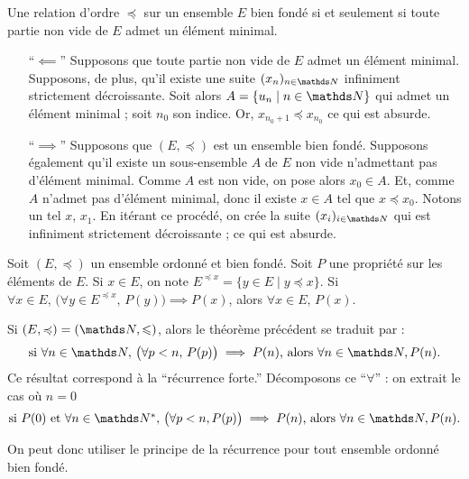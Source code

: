 \begin{prop}
	Une relation d'ordre $\preceq$\/ sur un ensemble $E$\/ bien fondé si et seulement si toute partie non vide de $E$\/ admet un élément minimal.
\end{prop}

\begin{prv}
	\begin{itemize}
		\item[``$\impliedby$'']
			Supposons que toute partie non vide de $E$\/ admet un élément minimal.
			Supposons, de plus, qu'il existe une suite $(x_n)_{n\in\N}$\/ infiniment strictement décroissante.
			Soit alors $A = \{u_n  \mid n \in \N\}$ qui admet un élément minimal ; soit $n_0$\/ son indice.
			Or, $x_{n_0+1}\preceq x_{n_0}$\/ ce qui est absurde.
		\item[``$\implies$'']
			Supposons que $(E, \preceq)$\/ est un ensemble bien fondé.
			Supposons également qu'il existe un sous-ensemble $A$\/ de $E$\/ non vide n'admettant pas d'élément minimal.
			Comme $A$\/ est non vide, on pose alors $x_0 \in A$.
			Et, comme $A$\/ n'admet pas d'élément minimal, donc il existe $x \in A$\/ tel que $x \preceq x_0$. Notons un tel $x$, $x_1$. En itérant ce procédé, on crée la suite $(x_i)_{i\in\N}$\/ qui est infiniment strictement décroissante ; ce qui est absurde.
	\end{itemize}
\end{prv}

\begin{thm}
	Soit $(E, \preceq)$\/ un ensemble ordonné et bien fondé. Soit $P$\/ une propriété sur les éléments de $E$.
	Si $x \in E$, on note $E^{\preceq x} = \{y \in E  \mid  y \preceq x\}$.
	Si $\forall x \in E,\,\big(\forall y \in E^{\preceq x},\,P(y)\big) \implies P(x)$, alors $\forall x \in E,\,P(x)$.
\end{thm}

\begin{rmk}
	Si $(E, \preceq) = (\N, \le)$, alors le théorème précédent se traduit par : \[
		\hbox{si $\forall n \in \N,\,\big(\forall p < n,\,P(p)\big)\implies P(n)$, alors $\forall n \in \N, P(n)$.}
	\]
	Ce résultat correspond à la ``récurrence forte.''
	Décomposons ce ``$\forall$\/'' : on extrait le cas où $n = 0$\/ \[
		\hbox{si $P(0)$\/ et $\forall n \in \N^*,\,\big(\forall p < n, P(p)\big) \implies P(n)$, alors $\forall n \in \N, P(n)$}
	.\] 
\end{rmk}

On peut donc utiliser le principe de la récurrence pour tout ensemble ordonné bien fondé.

